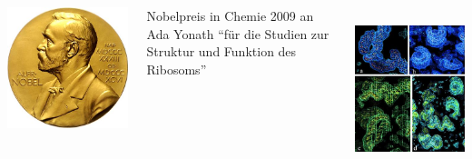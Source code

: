 \documentclass[10pt,t]{beamer}
\begin{document}
\begin{frame}
\begin{columns}
    \begin{minipage}[c]{0.2\textwidth}
        \includegraphics[width=\textwidth]{nobelpreis}
    \end{minipage}
    \hfill
    \begin{minipage}[c]{0.75\textwidth}\raggedright\footnotesize
        Nobelpreis in Chemie 2009 an Ada Yonath ``für die Studien zur Struktur und Funktion des Ribosoms''
    \end{minipage}
~\\[-\baselineskip]
    \includegraphics[width=\textwidth]{ribosomen-messung}

\end{columns}
\end{frame}
\end{document}
